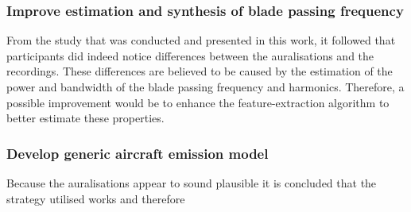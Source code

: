 \subsubsection*{Improve estimation and synthesis of blade passing frequency}
From the study that was conducted and presented in this work, it followed that
participants did indeed notice differences between the auralisations and the
recordings. These differences are believed to be caused by the estimation of the
power and bandwidth of the blade passing frequency and harmonics. Therefore, a
possible improvement would be to enhance the feature-extraction algorithm to
better estimate these properties.


\subsubsection*{Develop generic aircraft emission model}
Because the auralisations appear to sound plausible it is concluded that the strategy
utilised works and therefore


